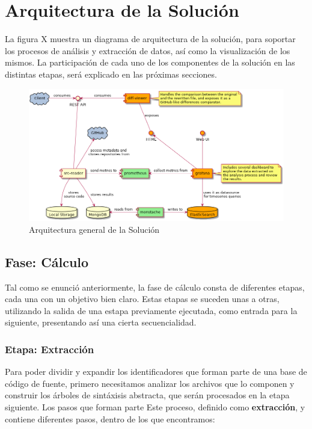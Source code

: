 \section{Arquitectura de la Solución}

La figura X muestra un diagrama de arquitectura de la solución, para
soportar los procesos de análisis y extracción de datos, así como la
visualización de los mismos.
La participación de cada uno de los componentes de la solución en las distintas
etapas, será explicado en las próximas secciones.

\begin{figure}[H]
    \includegraphics[width=12cm]{implementation/architecture_overview.png}
    \centering
    \caption{Arquitectura general de la Solución}
  \end{figure}

\subsection{Fase: Cálculo}

Tal como se enunció anteriormente, la fase de cálculo consta de diferentes etapas,
cada una con un objetivo bien claro.
Estas etapas se suceden unas a otras, utilizando la salida de una estapa previamente
ejecutada, como entrada para la siguiente, presentando así una cierta secuencialidad.


\subsubsection{Etapa: Extracción}

Para poder dividir y expandir los identificadores que forman parte de una base de código de fuente, 
primero necesitamos analizar los archivos que lo componen y construir los árboles de sintáxisis
abstracta, que serán procesados en la etapa siguiente.
Los pasos que forman parte 
Este proceso, definido como \textbf{extracción}, y contiene diferentes pasos,
dentro de los que encontramos:

